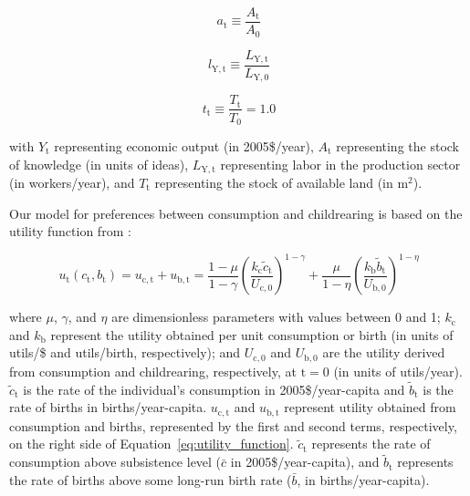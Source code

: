 \documentclass[letterpaper,12pt]{article}
\begin{document}
\begin{equation} \label{eq:index_a}
	a_\mathrm{t} \equiv \frac{A_\mathrm{t}}{A_\mathrm{0}}
\end{equation}

\begin{equation} \label{eq:index_l}
	l_\mathrm{Y,t} \equiv \frac{L_\mathrm{Y,t}}{L_\mathrm{Y,0}}
\end{equation}

\begin{equation} \label{eq:index_t}
	t_\mathrm{t} \equiv \frac{T_\mathrm{t}}{T_\mathrm{0}} = 1.0
\end{equation}

\noindent with $Y_\mathrm{t}$ representing economic output (in 2005\$/year), $A_\mathrm{t}$ representing the stock of knowledge (in units of ideas), $L_\mathrm{Y,t}$ representing labor in the production sector (in workers/year), and $T_\mathrm{t}$ representing the stock of available land (in m$^2$).

Our model for preferences between consumption and childrearing is based on the utility function from \citet{Jones:2001wn}:

\begin{equation} \label{eq:utility_function}
	u_\mathrm{t}(c_\mathrm{t}, b_\mathrm{t}) = u_\mathrm{c,t} + u_\mathrm{b,t} = \frac{1-\mu}{1-\gamma} \left(\frac{k_\mathrm{c} \tilde c_\mathrm{t}}{U_\mathrm{c,0}} \right)^{1-\gamma} + \frac{\mu}{1-\eta} \left(\frac{k_\mathrm{b} \tilde b_\mathrm{t}}{U_\mathrm{b,0}} \right)^{1-\eta}
\end{equation}

\noindent where $\mu$, $\gamma$, and $\eta$ are dimensionless parameters with values between 0 and 1; $k_\mathrm{c}$ and $k_\mathrm{b}$ represent the utility obtained per unit consumption or birth (in units of utils/\$ and utils/birth, respectively); and $U_{\mathrm{c,0}}$ and $U_{\mathrm{b,0}}$ are the utility derived from consumption and childrearing, respectively, at $\mathrm{t} = 0$ (in units of utils/year). $\tilde c_\mathrm{t}$ is the rate of the individual's consumption in 2005\$/year-capita and $\tilde b_\mathrm{t}$ is the rate of births in births/year-capita. $u_\mathrm{c,t}$ and $u_\mathrm{b,t}$ represent utility obtained from consumption and births, represented by the first and second terms, respectively, on the right side of Equation~\ref{eq:utility_function}. $\tilde c_\mathrm{t}$ represents the rate of consumption above subsistence level ($\bar c$ in 2005\$/year-capita), and $\tilde b_\mathrm{t}$ represents the rate of births above some long-run birth rate ($\bar b$, in births/year-capita).
\end{document}
